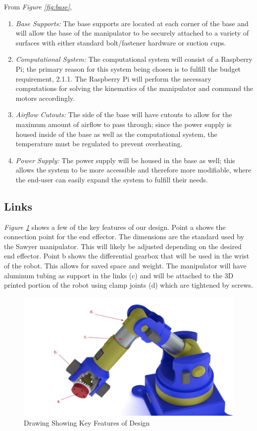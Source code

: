 \documentclass[12pt]{report}
\begin{document}
From \emph{Figure \ref{fig:base}},
\begin{enumerate}[label=\alph*.]
  \item \emph{Base Supports:}
  The base supports are located at each corner of the base and will allow the base of the manipulator to be securely attached to a variety of surfaces with either standard bolt/fastener hardware or suction cups.
  \item \emph{Computational System:}
  The computational system will consist of a Raspberry Pi; the primary reason for this system being chosen is to fulfill the budget requirement, 2.1.1. The Raspberry Pi will perform the necessary computations for solving the kinematics of the manipulator and command the motors accordingly.
  \item \emph{Airflow Cutouts:}
  The side of the base will have cutouts to allow for the maximum amount of airflow to pass through; since the power supply is housed inside of the base as well as the computational system, the temperature must be regulated to prevent overheating.
  \item \emph{Power Supply:}
  The power supply will be housed in the base as well; this allows the system to be more accessible and therefore more modifiable, where the end-user can easily expand the system to fulfill their needs.
\end{enumerate}
\newpage
\subsection{Links}
\emph{Figure \ref{fig:link1}} shows a few of the key features of our design. Point a shows the connection point for the end effector. The dimensions are the standard used by the Sawyer manipulator. This will likely be adjusted depending on the desired end effector. Point b shows the differential gearbox that will be used in the wrist of the robot. This allows for saved space and weight. The manipulator will have aluminum tubing as support in the links (c) and will be attached to the 3D printed portion of the robot using clamp joints (d) which are tightened by screws.

\begin{figure}[htp]
  \centering
  \includegraphics[frame,width=.75\textwidth]{link_callouts}
  \caption{Drawing Showing Key Features of Design}
  \label{fig:link1}
\end{figure}
\end{document}
